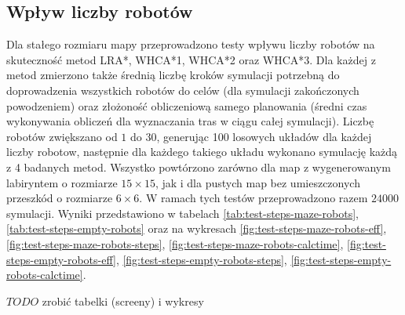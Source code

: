 \subsection{Wpływ liczby robotów} %
\label{ch:tests-function-robots}
Dla stałego rozmiaru mapy przeprowadzono testy wpływu liczby robotów na skuteczność metod LRA*, WHCA*1, WHCA*2 oraz WHCA*3.
Dla każdej z metod zmierzono także średnią liczbę kroków symulacji potrzebną do doprowadzenia wszystkich robotów do celów (dla symulacji zakończonych powodzeniem) oraz złożoność obliczeniową samego planowania (średni czas wykonywania obliczeń dla wyznaczania tras w ciągu całej symulacji).
Liczbę robotów zwiększano od $1$ do $30$, generując 100 losowych układów dla każdej liczby robotow, następnie dla każdego takiego układu wykonano symulację każdą z 4 badanych metod.
Wszystko powtórzono zarówno dla map z wygenerowanym labiryntem o rozmiarze $15 \times 15$, jak i dla pustych map bez umieszczonych przeszkód o rozmiarze $6 \times 6$.
W ramach tych testów przeprowadzono razem $24 000$ symulacji.
Wyniki przedstawiono w tabelach \ref{tab:test-steps-maze-robots}, \ref{tab:test-steps-empty-robots} oraz na wykresach \ref{fig:test-steps-maze-robots-eff}, \ref{fig:test-steps-maze-robots-steps}, \ref{fig:test-steps-maze-robots-calctime}, \ref{fig:test-steps-empty-robots-eff}, \ref{fig:test-steps-empty-robots-steps}, \ref{fig:test-steps-empty-robots-calctime}.

$TODO$ zrobić tabelki (screeny) i wykresy

